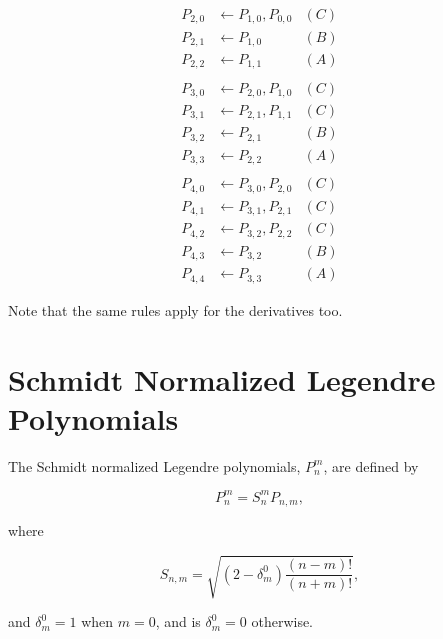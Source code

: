 \documentclass[]{article}
\begin{document}
		\begin{align}
			P_{2,0} &\leftarrow P_{1,0},P_{0,0} &(C) \\
			P_{2,1} &\leftarrow P_{1,0}			&(B) \\
			P_{2,2} &\leftarrow P_{1,1}			&(A) \\
			\nonumber \\
			P_{3,0} &\leftarrow P_{2,0},P_{1,0} &(C) \\
			P_{3,1} &\leftarrow P_{2,1},P_{1,1} &(C) \\
			P_{3,2} &\leftarrow P_{2,1}			&(B) \\
			P_{3,3} &\leftarrow P_{2,2}			&(A) \\
			\nonumber \\
			P_{4,0} &\leftarrow P_{3,0},P_{2,0} &(C) \\
			P_{4,1} &\leftarrow P_{3,1},P_{2,1} &(C) \\
			P_{4,2} &\leftarrow P_{3,2},P_{2,2} &(C) \\
			P_{4,3} &\leftarrow P_{3,2}			&(B) \\
			P_{4,4} &\leftarrow P_{3,3}			&(A) 
		\end{align}
	
		Note that the same rules apply for the derivatives too.
		
\section{Schmidt Normalized Legendre Polynomials}
	
	The Schmidt normalized Legendre polynomials, $P_n^m$, are defined by
	
	\begin{equation}
		P_n^m = S_n^m P_{n,m},
	\end{equation}
	
	where 
	
	\begin{equation}
		S_{n,m} = \sqrt{(2-\delta_m^0)\frac{(n-m)!}{(n+m)!}},
	\end{equation}
	
	and $\delta_m^0 = 1$ when $m = 0$, and is $\delta_m^0 = 0$ otherwise.


\end{document}
